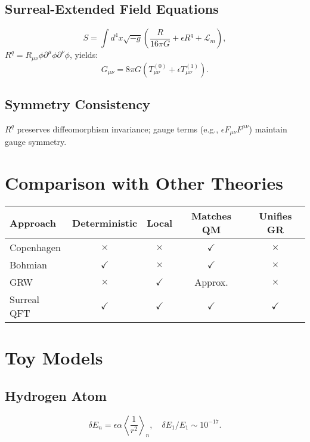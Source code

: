 \documentclass{article}
\begin{document}
\subsection{Surreal-Extended Field Equations}
\begin{equation}
S = \int d^4x \sqrt{-g} \left( \frac{R}{16\pi G} + \epsilon R^q + \mathcal{L}_m \right),
\end{equation}
\(R^q = R_{\mu\nu} \phi \partial^\mu \phi \partial^\nu \phi\), yields:
\begin{equation}
G_{\mu\nu} = 8\pi G \left( T_{\mu\nu}^{(0)} + \epsilon T_{\mu\nu}^{(1)} \right).
\end{equation}

\subsection{Symmetry Consistency}
\(R^q\) preserves diffeomorphism invariance; gauge terms (e.g., \(\epsilon F_{\mu\nu} F^{\mu\nu}\)) maintain gauge symmetry.

\section{Comparison with Other Theories}
\begin{center}
\begin{tabular}{lcccc}
\hline
\textbf{Approach} & \textbf{Deterministic} & \textbf{Local} & \textbf{Matches QM} & \textbf{Unifies GR} \\
\hline
Copenhagen & $\times$ & $\times$ & $\checkmark$ & $\times$ \\
Bohmian & $\checkmark$ & $\times$ & $\checkmark$ & $\times$ \\
GRW & $\times$ & $\checkmark$ & Approx. & $\times$ \\
Surreal QFT & $\checkmark$ & $\checkmark$ & $\checkmark$ & $\checkmark$ \\
\hline
\end{tabular}
\end{center}

\section{Toy Models}
\subsection{Hydrogen Atom}
\begin{equation}
\delta E_n = \epsilon \alpha \left\langle \frac{1}{r^2} \right\rangle_n, \quad \delta E_1 / E_1 \sim 10^{-17}.
\end{equation}
\end{document}
